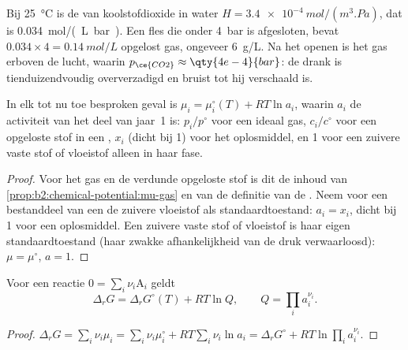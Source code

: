 \begin{example}\label{ex:b2:chemical-potential:soda}
Bij \qty{25}{\celsius} is de  van koolstofdioxide in water $H =
\qty{3.4e-4}{mol/(m^3.Pa)}$, dat is \qty{0.034}{mol/(L.bar)}. Een fles die
onder \qty{4}{bar}  is afgesloten, bevat $0.034 \times 4 =
\qty{0.14}{mol/L}$ opgelost gas, ongeveer \qty{6}{g/L}. Na het openen is het gas
erboven de lucht, waarin $p_{\ce{CO2}} \approx \qty{4e-4}{bar}$: de drank is
tienduizendvoudig oververzadigd en bruist tot hij verschaald is.
\end{example}

\begin{proposition}\label{prop:b2:chemical-potential:activity}
In elk tot nu toe besproken geval is $\mu_i = \mu_i^\circ(T) + RT\ln a_i$, waarin $a_i$
de activiteit van het deel van jaar~1 is: $p_i/p^\circ$ voor een ideaal gas,
$c_i/c^\circ$ voor een opgeloste stof in een , $x_i$ (dicht bij 1)
voor het oplosmiddel, en 1 voor een zuivere vaste stof of vloeistof alleen in haar fase.
\end{proposition}

\begin{proof}
Voor het gas en de verdunde opgeloste stof is dit de inhoud van
\cref{prop:b2:chemical-potential:mu-gas} en van de definitie van de . Neem voor een bestanddeel van een  de zuivere
vloeistof als standaardtoestand: $a_i = x_i$, dicht bij 1 voor een oplosmiddel. Een zuivere vaste stof
of vloeistof is haar eigen standaardtoestand (haar zwakke afhankelijkheid van de druk
verwaarloosd): $\mu = \mu^\circ$, $a = 1$.
\end{proof}

\begin{proposition}\label{prop:b2:chemical-potential:delta-g-q}
Voor een reactie $0 = \sum_i\nu_i\mathrm A_i$ geldt
\[
  \Delta_r G = \Delta_r G^\circ(T) + RT\ln Q, \qquad Q = \prod_i a_i^{\nu_i} .
\]
\end{proposition}

\begin{proof}
$\Delta_r G = \sum_i\nu_i\mu_i = \sum_i\nu_i\mu_i^\circ + RT\sum_i\nu_i\ln a_i =
\Delta_r G^\circ + RT\ln\prod_i a_i^{\nu_i}$.
\end{proof}

